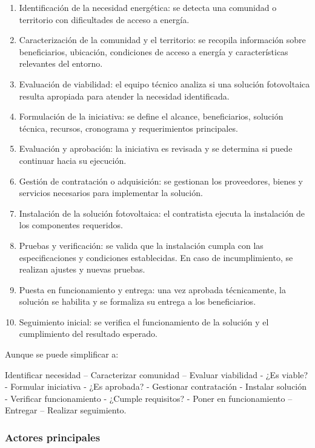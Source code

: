 \begin{enumerate}
    \item Identificación de la necesidad energética: se detecta una comunidad o territorio con dificultades de acceso a energía.
    \item Caracterización de la comunidad y el territorio: se recopila información sobre beneficiarios, ubicación, condiciones de acceso a energía y características relevantes del entorno.
    \item Evaluación de viabilidad: el equipo técnico analiza si una solución fotovoltaica resulta apropiada para atender la necesidad identificada.
    \item Formulación de la iniciativa: se define el alcance, beneficiarios, solución técnica, recursos, cronograma y requerimientos principales.
    \item Evaluación y aprobación: la iniciativa es revisada y se determina si puede continuar hacia su ejecución.
    \item Gestión de contratación o adquisición: se gestionan los proveedores, bienes y servicios necesarios para implementar la solución.
    \item Instalación de la solución fotovoltaica: el contratista ejecuta la instalación de los componentes requeridos.
    \item Pruebas y verificación: se valida que la instalación cumpla con las especificaciones y condiciones establecidas. En caso de incumplimiento, se realizan ajustes y nuevas pruebas.
    \item Puesta en funcionamiento y entrega: una vez aprobada técnicamente, la solución se habilita y se formaliza su entrega a los beneficiarios.
    \item Seguimiento inicial: se verifica el funcionamiento de la solución y el cumplimiento del resultado esperado.
\end{enumerate}

Aunque se puede simplificar a:

Identificar necesidad – Caracterizar comunidad – Evaluar viabilidad - ¿Es viable? - Formular iniciativa - ¿Es aprobada? - Gestionar contratación - Instalar solución - Verificar funcionamiento - ¿Cumple requisitos? - Poner en funcionamiento – Entregar – Realizar seguimiento.

\subsubsection*{Actores principales}

